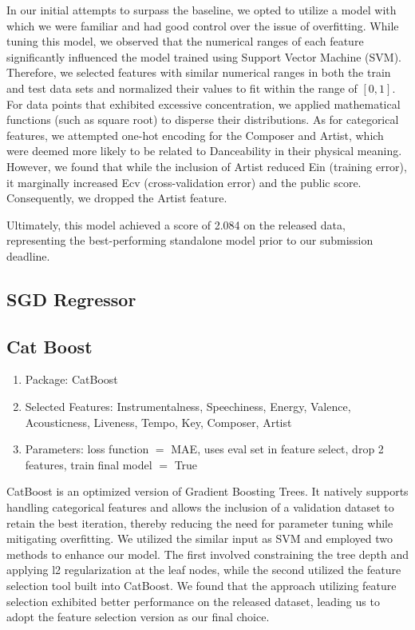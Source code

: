 \documentclass[10pt,letterpaper]{article}
\begin{document}
In our initial attempts to surpass the baseline, 
we opted to utilize a model with which we were familiar and had good control over the issue of overfitting. 
While tuning this model, we observed that the numerical ranges of each feature significantly influenced the model trained using Support Vector Machine (SVM). 
Therefore, we selected features with similar numerical ranges in both the train and test data sets and normalized their values to fit within the range of $[0, 1]$. 
For data points that exhibited excessive concentration, we applied mathematical functions (such as square root) to disperse their distributions. 
As for categorical features, we attempted one-hot encoding for the Composer and Artist, 
which were deemed more likely to be related to Danceability in their physical meaning. 
However, we found that while the inclusion of Artist reduced Ein (training error), 
it marginally increased Ecv (cross-validation error) and the public score. 
Consequently, we dropped the Artist feature.

Ultimately, this model achieved a score of 2.084 on the released data, 
representing the best-performing standalone model prior to our submission deadline.

\subsection{SGD Regressor}
\subsection{Cat Boost}
\begin{enumerate}
	\item Package: CatBoost
	\item Selected Features: Instrumentalness, Speechiness, Energy, Valence, Acousticness, Liveness, Tempo, Key, Composer, Artist
	\item Parameters: loss function $=$ MAE, uses eval set in feature select, drop 2 features, train final model $=$ True
\end{enumerate}

CatBoost is an optimized version of Gradient Boosting Trees. 
It natively supports handling categorical features and allows the inclusion of a validation dataset to retain the best iteration, 
thereby reducing the need for parameter tuning while mitigating overfitting. 
We utilized the similar input as SVM and employed two methods to enhance our model. 
The first involved constraining the tree depth and applying l2 regularization at the leaf nodes, 
while the second utilized the feature selection tool built into CatBoost. 
We found that the approach utilizing feature selection exhibited better performance on the released dataset, 
leading us to adopt the feature selection version as our final choice.
\end{document}
